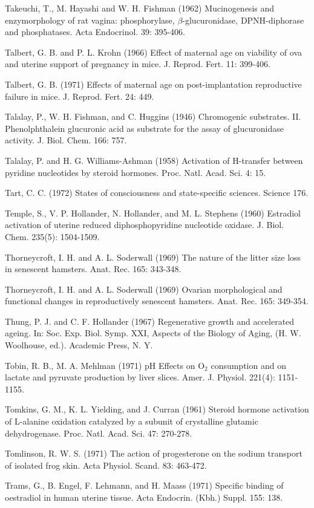Takeuchi, T., M. Hayashi and W. H. Fishman (1962) Mucinogenesis and enzymorphology of rat vagina: phosphorylase, $\beta$-glucuronidase, DPNH-diphorase and phosphatases. Acta Endocrinol. 39: 395-406.

Talbert, G. B. and P. L. Krohn (1966) Effect of maternal age on viability of ova and uterine support of pregnancy in mice. J. Reprod. Fert. 11: 399-406.

Talbert, G. B. (1971) Effects of maternal age on post-implantation reproductive failure in mice. J. Reprod. Fert. 24: 449.

Talalay, P., W. H. Fishman, and C. Huggins (1946) Chromogenic substrates. II. Phenolphthalein glucuronic acid as substrate for the assay of glucuronidase activity. J. Biol. Chem. 166: 757.

Talalay, P. and H. G. Williams-Ashman (1958) Activation of H-transfer between pyridine nucleotides by steroid hormones. Proc. Natl. Acad. Sci. 4: 15.

Tart, C. C. (1972) States of consciousness and state-specific sciences. Science 176.

Temple, S., V. P. Hollander, N. Hollander, and M. L. Stephens (1960) Estradiol activation of uterine reduced diphosphopyridine nucleotide oxidase. J. Biol. Chem. 235(5): 1504-1509.

Thorneycroft, I. H. and A. L. Soderwall (1969) The nature of the litter size loss in senescent hamsters. Anat. Rec. 165: 343-348.

Thorneycroft, I. H. and A. L. Soderwall (1969) Ovarian morphological and functional changes in reproductively senescent hamsters. Anat. Rec. 165: 349-354.

Thung, P. J. and C. F. Hollander (1967) Regenerative growth and accelerated ageing. In: Soc. Exp. Biol. Symp. XXI, Aspects of the Biology of Aging, (H. W. Woolhouse, ed.). Academic Press, N. Y.

Tobin, R. B., M. A. Mehlman (1971) pH Effects on O$_2$ consumption and on lactate and pyruvate production by liver slices. Amer. J. Physiol. 221(4): 1151-1155.

Tomkins, G. M., K. L. Yielding, and J. Curran (1961) Steroid hormone activation of L-alanine oxidation catalyzed by a subunit of crystalline glutamic dehydrogenase. Proc. Natl. Acad. Sci. 47: 270-278.

Tomlinson, R. W. S. (1971) The action of progesterone on the sodium transport of isolated frog skin. Acta Physiol. Scand. 83: 463-472.

Trams, G., B. Engel, F. Lehmann, and H. Maass (1971) Specific binding of oestradiol in human uterine tissue. Acta Endocrin. (Kbh.) Suppl. 155: 138.

